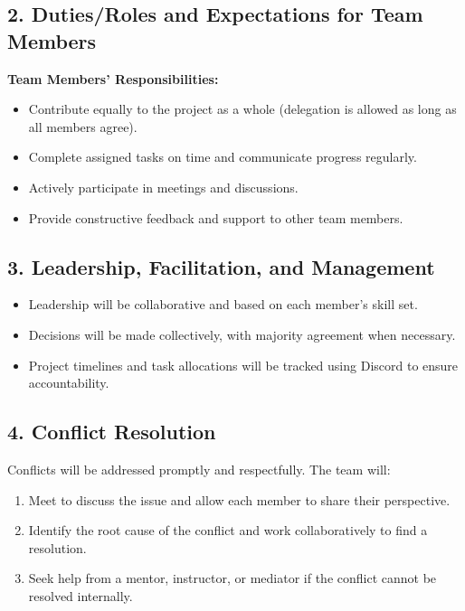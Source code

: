 \documentclass{article}
\begin{document}
\subsection*{2. Duties/Roles and Expectations for Team Members}

\textbf{Team Members’ Responsibilities:}
\begin{itemize}
    \item Contribute equally to the project as a whole (delegation is allowed as long as all members agree).
    \item Complete assigned tasks on time and communicate progress regularly.
    \item Actively participate in meetings and discussions.
    \item Provide constructive feedback and support to other team members.
\end{itemize}

\subsection*{3. Leadership, Facilitation, and Management}
\begin{itemize}
    \item Leadership will be collaborative and based on each member’s skill set.
    \item Decisions will be made collectively, with majority agreement when necessary.
    \item Project timelines and task allocations will be tracked using Discord to ensure accountability.
\end{itemize}

\subsection*{4. Conflict Resolution}
Conflicts will be addressed promptly and respectfully. The team will:
\begin{enumerate}
    \item Meet to discuss the issue and allow each member to share their perspective.
    \item Identify the root cause of the conflict and work collaboratively to find a resolution.
    \item Seek help from a mentor, instructor, or mediator if the conflict cannot be resolved internally.
\end{enumerate}
\end{document}
